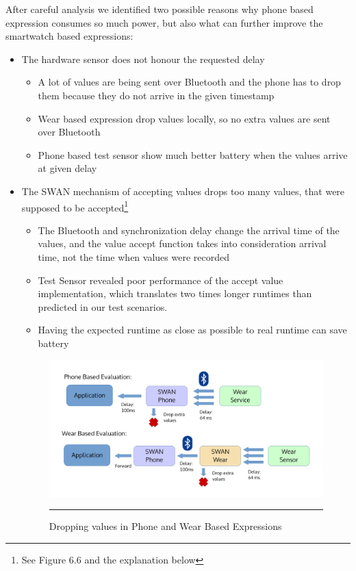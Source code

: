 After careful analysis we identified two possible reasons why phone based expression consumes so much power, but also what can further improve the smartwatch based expressions:
\begin{itemize}
 \item The hardware sensor does not honour the requested delay
 \begin{itemize}
  \item A lot of values are being sent over Bluetooth and the phone has to drop them because they do not arrive in the given timestamp
  \item Wear based expression drop values locally, so no extra values are sent over Bluetooth
  \item Phone based test sensor show much better battery when the values arrive at given delay
 \end{itemize}
 \item The SWAN mechanism of accepting values drops too many values, that were supposed to be accepted\footnote{See Figure 6.6 and the explanation below}
 \begin{itemize}
  \item The Bluetooth and synchronization delay change the arrival time of the values, and the value accept function takes into consideration arrival time, not the time when values were recorded
  \item Test Sensor revealed poor performance of the accept value implementation, which translates two times longer runtimes than predicted in our test scenarios.
  \item Having the expected runtime as close as possible to real runtime can save battery
 \end{itemize}

  \begin{figure}[htbp]
  \centering
    \includegraphics[scale=0.5]{Figures/swan_drop_val.pdf}
    \rule{35em}{0.5pt}
  \caption[Dropping values in Phone and Wear Based Expressions]{Dropping values in Phone and Wear Based Expressions}
  \label{fig:swan_drop_val}
\end{figure}


\end{itemize}
